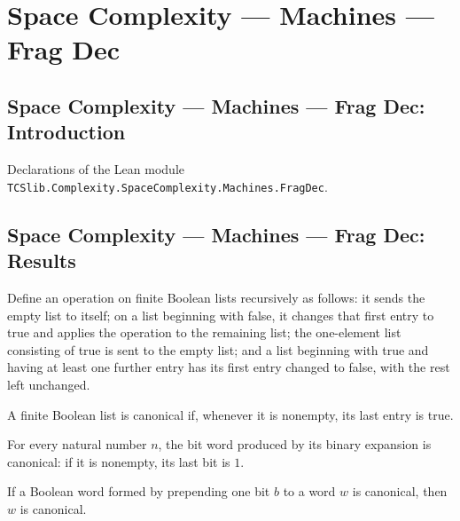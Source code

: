 \section{Space Complexity --- Machines --- Frag Dec}
\subsection*{Space Complexity --- Machines --- Frag Dec: Introduction}

Declarations of the Lean module \texttt{TCSlib.Complexity.SpaceComplexity.Machines.FragDec}.

\subsection*{Space Complexity --- Machines --- Frag Dec: Results}

\begin{definition}
\label{Complexity.LogProg.decW}
\leanok
Define an operation on finite Boolean lists recursively as follows: it sends the empty
list to itself; on a list beginning with false, it changes that first entry to true and
applies the operation to the remaining list; the one-element list consisting of true is
sent to the empty list; and a list beginning with true and having at least one further
entry has its first entry changed to false, with the rest left unchanged.
\end{definition}

\begin{definition}
\label{Complexity.LogProg.Canon}
\leanok
A finite Boolean list is canonical if, whenever it is nonempty, its last entry is true.
\end{definition}

\begin{lemma}
\label{Complexity.LogProg.canon_bits}
\leanok
{}
For every natural number $n$, the bit word produced by its binary expansion is
canonical: if it is nonempty, its last bit is $1$.
\end{lemma}

\begin{lemma}
\label{Complexity.LogProg.canon_tail}
\leanok
{}
If a Boolean word formed by prepending one bit $b$ to a word $w$ is canonical, then $w$
is canonical.
\end{lemma}

